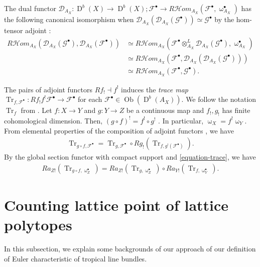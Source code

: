 \documentclass[a4paper,dvipdfmx,reqno,12pt]{amsart}
\theoremstyle{definition}
\newcommand{\opn}[1]{\operatorname{#1}}
\numberwithin{equation}{section}
\begin{document}
The dual functor
$\mathcal{D}_{A_X}\colon \opn{D}^{b}(X)\to 
\opn{D}^{b}(X); \mathcal{F}^{\bullet} \to  R\mathcal{H}om_{A_X}(\mathcal{F}^{\bullet},
\upomega_{A_X}^{\bullet})$
has the following canonical isomorphism when 
$\mathcal{D}_{A_X}(\mathcal{D}_{A_X}(\mathcal{G}^{\bullet}))
\simeq \mathcal{G}^{\bullet}$ by the hom-tensor adjoint
\cite[Proposition 2.6.3]{MR1299726}:
\begin{align}
R\mathcal{H}om_{A_X}
(\mathcal{D}_{A_X}(\mathcal{G}^{\bullet}),
\mathcal{D}_{A_X}(\mathcal{F}^{\bullet})) 
& \simeq R\mathcal{H}om_{A_X}
(\mathcal{F}^{\bullet}\otimes^{L}_{A_X}
\mathcal{D}_{A_X}(\mathcal{G}^{\bullet}),
\upomega_{A_X}^{\bullet}) \\
& \simeq R\mathcal{H}om_{A_X}
(\mathcal{F}^{\bullet},
\mathcal{D}_{A_X}(\mathcal{D}_{A_X}(\mathcal{G}^{\bullet}))) \\
& \simeq R\mathcal{H}om_{A_X}
(\mathcal{F}^{\bullet},
\mathcal{G}^{\bullet}).
\end{align}




The pairs of adjoint functors $Rf_! \dashv f^{!}$ 
induces the \emph{trace map} $\opn{Tr}_{f,\mathcal{F}^{\bullet}}\colon Rf_!f^{!}\mathcal{F}^{\bullet}
\to \mathcal{F}^{\bullet}$ for each 
$\mathcal{F}^{\bullet}\in \opn{Ob}(\opn{D}^{b}(A_X))$.
We follow the notation $\opn{Tr}_f$ from 
\cite[p.20]{MR1299726}.
Let $f\colon X\to Y $ and $g\colon Y\to Z$ be 
a continuous map and $f_!,g_!$ has finite cohomological 
dimension. Then, $(g\circ f)^{!}=f^{!}\circ g^{!}$
\cite[Proposition 3.1.8]{MR1299726}.
In particular, $\upomega_X=f^{!}\upomega_Y$.
From elemental properties of the composition of
adjoint functors \cite[p.103]{MR1712872}, we have
\begin{align}
\label{equation-trace}
\opn{Tr}_{g\circ f,\mathcal{F}^{\bullet}}=
\opn{Tr}_{g,\mathcal{F}^{\bullet}} 
\circ Rg_!(\opn{Tr}_{f,g^{!}(\mathcal{F}^{\bullet})}).
\end{align}
By the global section functor with compact support and
\cref{equation-trace}, we have
\begin{align}
\label{equation-trace-push}
Ra_{Z!}(\opn{Tr}_{g\circ f,\upomega_{Z}^{\bullet}})
=Ra_{Z!}(\opn{Tr}_{g,\upomega_{Z}^{\bullet}})
\circ Ra_{Y!}(\opn{Tr}_{f,\upomega_{Y}^{\bullet}}).
\end{align}


\section{Counting lattice point of lattice polytopes}
\label{section-toric-geometry}
In this subsection, we explain some backgrounds of 
our approach of our definition of Euler characteristic
of tropical line bundles.
\end{document}
